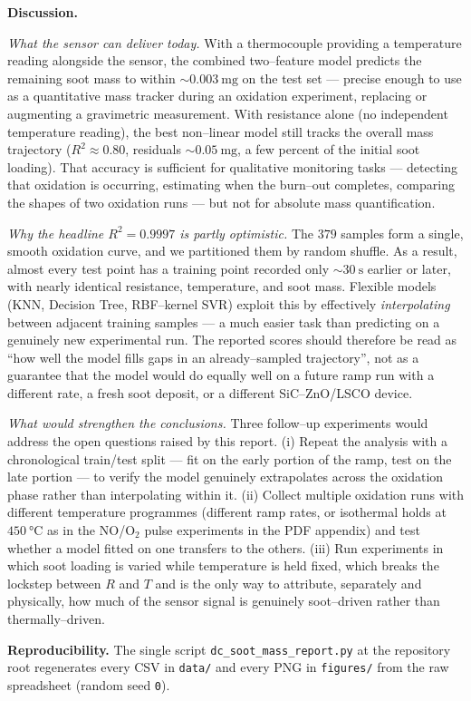 \documentclass[10pt]{article}
\begin{document}
\textbf{Discussion.}

\emph{What the sensor can deliver today.}
With a thermocouple providing a temperature reading alongside the sensor, the
combined two--feature model predicts the remaining soot mass to within
${\sim}\SI{0.003}{\milli\gram}$ on the test set --- precise enough to use as a
quantitative mass tracker during an oxidation experiment, replacing or
augmenting a gravimetric measurement. With resistance alone (no independent
temperature reading), the best non--linear model still tracks the overall mass
trajectory ($R^{2}\!\approx\!0.80$, residuals ${\sim}\SI{0.05}{\milli\gram}$,
a few percent of the initial soot loading). That accuracy is sufficient for
qualitative monitoring tasks --- detecting that oxidation is occurring,
estimating when the burn--out completes, comparing the shapes of two
oxidation runs --- but not for absolute mass quantification.

\emph{Why the headline $R^{2}=\!0.9997$ is partly optimistic.}
The $379$ samples form a single, smooth oxidation curve, and we partitioned
them by random shuffle. As a result, almost every test point has a training
point recorded only ${\sim}\SI{30}{\second}$ earlier or later, with nearly
identical resistance, temperature, and soot mass. Flexible models (KNN,
Decision Tree, RBF--kernel SVR) exploit this by effectively
\emph{interpolating} between adjacent training samples --- a much easier task
than predicting on a genuinely new experimental run. The reported scores
should therefore be read as ``how well the model fills gaps in an
already--sampled trajectory'', not as a guarantee that the model would do
equally well on a future ramp run with a different rate, a fresh soot
deposit, or a different SiC--ZnO/LSCO device.

\emph{What would strengthen the conclusions.}
Three follow--up experiments would address the open questions raised by this
report. (i) Repeat the analysis with a chronological train/test split --- fit
on the early portion of the ramp, test on the late portion --- to verify the
model genuinely extrapolates across the oxidation phase rather than
interpolating within it. (ii) Collect multiple oxidation runs with different
temperature programmes (different ramp rates, or isothermal holds at
$\SI{450}{\celsius}$ as in the NO/O$_2$ pulse experiments in the PDF
appendix) and test whether a model fitted on one transfers to the others.
(iii) Run experiments in which soot loading is varied while temperature is
held fixed, which breaks the lockstep between $R$ and $T$ and is the only way
to attribute, separately and physically, how much of the sensor signal is
genuinely soot--driven rather than thermally--driven.

\textbf{Reproducibility.}
The single script \texttt{dc\_soot\_mass\_report.py} at the repository root
regenerates every CSV in \texttt{data/} and every PNG in \texttt{figures/}
from the raw spreadsheet (random seed \texttt{0}).
\end{document}
